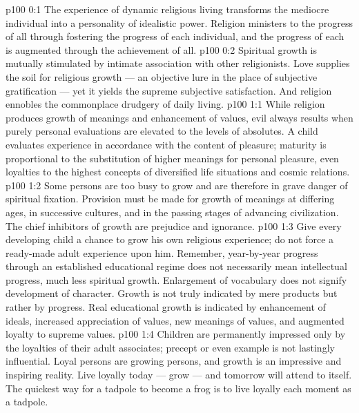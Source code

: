\author{Melchizedek}
\vs p100 0:1 The experience of dynamic religious living transforms the mediocre individual into a personality of idealistic power. Religion ministers to the progress of all through fostering the progress of each individual, and the progress of each is augmented through the achievement of all.
\vs p100 0:2 Spiritual growth is mutually stimulated by intimate association with other religionists. Love supplies the soil for religious growth --- an objective lure in the place of subjective gratification --- yet it yields the supreme subjective satisfaction. And religion ennobles the commonplace drudgery of daily living.
\vs p100 1:1 While religion produces growth of meanings and enhancement of values, evil always results when purely personal evaluations are elevated to the levels of absolutes. A child evaluates experience in accordance with the content of pleasure; maturity is proportional to the substitution of higher meanings for personal pleasure, even loyalties to the highest concepts of diversified life situations and cosmic relations.
\vs p100 1:2 Some persons are too busy to grow and are therefore in grave danger of spiritual fixation. Provision must be made for growth of meanings at differing ages, in successive cultures, and in the passing stages of advancing civilization. The chief inhibitors of growth are prejudice and ignorance.
\vs p100 1:3 Give every developing child a chance to grow his own religious experience; do not force a ready\hyp{}made adult experience upon him. Remember, year\hyp{}by\hyp{}year progress through an established educational regime does not necessarily mean intellectual progress, much less spiritual growth. Enlargement of vocabulary does not signify development of character. Growth is not truly indicated by mere products but rather by progress. Real educational growth is indicated by enhancement of ideals, increased appreciation of values, new meanings of values, and augmented loyalty to supreme values.
\vs p100 1:4 Children are permanently impressed only by the loyalties of their adult associates; precept or even example is not lastingly influential. Loyal persons are growing persons, and growth is an impressive and inspiring reality. Live loyally today --- grow --- and tomorrow will attend to itself. The quickest way for a tadpole to become a frog is to live loyally each moment as a tadpole.
